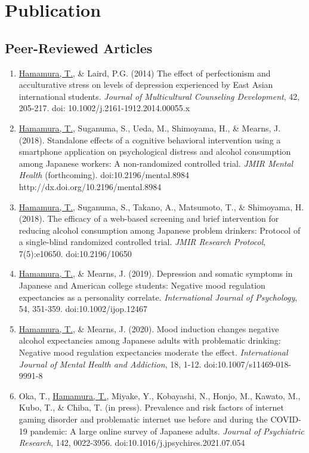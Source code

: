 \documentclass{article}
\begin{document}
\section{Publication}
\subsection{Peer-Reviewed Articles}
\begin{enumerate}
	\item \underline{Hamamura, T.}, \& Laird, P.G. (2014) The effect of perfectionism and acculturative stress on levels of depression experienced by East Asian international students. \textit{Journal of Multicultural Counseling Development}, 42, 205-217. doi: 10.1002/j.2161-1912.2014.00055.x
	\item \underline{Hamamura, T.}, Suganuma, S., Ueda, M., Shimoyama, H., \& Mearns, J. (2018). Standalone effects of a cognitive behavioral intervention using a smartphone application on psychological distress and alcohol consumption among Japanese workers: A non-randomized controlled trial. \textit{JMIR Mental Health} (forthcoming). doi:10.2196/mental.8984 http://dx.doi.org/10.2196/mental.8984
	\item \underline{Hamamura, T.}, Suganuma, S., Takano, A., Matsumoto, T., \& Shimoyama, H. (2018). The efficacy of a web-based screening and brief intervention for reducing alcohol consumption among Japanese problem drinkers: Protocol of a single-blind randomized controlled trial. \textit{JMIR Research Protocol}, 7(5):e10650. doi:10.2196/10650
	\item \underline{Hamamura, T.}, \& Mearns, J. (2019). Depression and somatic symptoms in Japanese and American college students: Negative mood regulation expectancies as a personality correlate. \textit{International Journal of Psychology}, 54, 351-359. doi:10.1002/ijop.12467
	\item \underline{Hamamura, T.}, \& Mearns, J. (2020). Mood induction changes negative alcohol expectancies among Japanese adults with problematic drinking: Negative mood regulation expectancies moderate the effect. \textit{International Journal of Mental Health and Addiction}, 18, 1-12. doi:10.1007/s11469-018-9991-8
	\item Oka, T., \underline{Hamamura, T.}, Miyake, Y.,  Kobayashi, N., Honjo, M., Kawato, M., Kubo, T., \& Chiba, T. (in press). Prevalence and risk factors of internet gaming disorder and problematic internet use before and during the COVID-19 pandemic: A large online survey of Japanese adults. \textit{Journal of Psychiatric Research}, 142, 0022-3956. doi:10.1016/j.jpsychires.2021.07.054

\end{enumerate}
\end{document}
